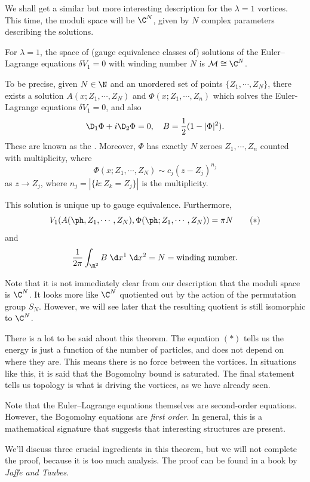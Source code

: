 \documentclass[a4paper]{article}
\begin{document}
We shall get a similar but more interesting description for the $\lambda = 1$ vortices. This time, the moduli space will be $\C^N$, given by $N$ complex parameters describing the solutions.

\begin{thm}
  For $\lambda = 1$, the space of (gauge equivalence classes of) solutions of the Euler--Lagrange equations $\delta V_1 = 0$ with winding number $N$ is $\mathcal{M} \cong \C^N$.

  To be precise, given $N \in \N$ and an unordered set of points $\{Z_1, \cdots, Z_N\}$, there exists a solution $A(x; Z_1, \cdots, Z_N)$ and $\Phi(x; Z_1, \cdots, Z_n)$ which solves the Euler-Lagrange equations $\delta V_1 = 0$, and also
  \[
    \D_1 \Phi + i \D_2 \Phi = 0, \quad B = \frac{1}{2} (1 - |\Phi|^2).
  \]
  These are known as the . Moreover, $\Phi$ has exactly $N$ zeroes $Z_1, \cdots, Z_n$ counted with multiplicity, where
  \[
    \Phi(x; Z_1, \cdots, Z_N) \sim c_j (z - Z_j)^{n_j}
  \]
  as $z \to Z_j$, where $n_j = |\{k: Z_k = Z_j\}|$ is the multiplicity.

  This solution is unique up to gauge equivalence. Furthermore,
  \[
    V_1(A(\ph, Z_1, \cdots, Z_N), \Phi(\ph; Z_1, \cdots, Z_N)) = \pi N\tag{$*$}
  \]
  and
  \[
    \frac{1}{2\pi} \int_{\R^2} B\;\d x^1 \;\d x^2 = N = \text{winding number}.
  \]
\end{thm}
Note that it is not immediately clear from our description that the moduli space is $\C^N$. It looks more like $\C^N$ quotiented out by the action of the permutation group $S_N$. However, we will see later that the resulting quotient is still isomorphic to $\C^N$.

There is a lot to be said about this theorem. The equation $(*)$ tells us the energy is just a function of the number of particles, and does not depend on where they are. This means there is no force between the vortices. In situations like this, it is said that the Bogomolny bound is saturated. The final statement tells us topology is what is driving the vortices, as we have already seen.

Note that the Euler--Lagrange equations themselves are second-order equations. However, the Bogomolny equations are \emph{first order}. In general, this is a mathematical signature that suggests that interesting structures are present.

We'll discuss three crucial ingredients in this theorem, but we will not complete the proof, because it is too much analysis. The proof can be found in a book by \emph{Jaffe and Taubes}.
\end{document}

